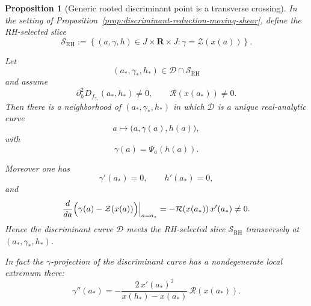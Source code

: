 \documentclass[11pt,a4paper]{amsart}
\theoremstyle{plain}
\newtheorem{proposition}[theorem]{Proposition}
\theoremstyle{definition}
\begin{document}
\begin{proposition}[Generic rooted discriminant point is a transverse crossing]
\label{prop:generic-rooted-discriminant-point-transverse-crossing}
In the setting of
Proposition~\ref{prop:discriminant-reduction-moving-shear},
define the RH-selected slice
\[
\mathcal S_{\mathrm{RH}}
:=
\left\{
(a,\gamma,h)\in J\times\mathbf R\times J:
\gamma=\mathcal Z(x(a))
\right\}.
\]

Let
\[
(a_*,\gamma_*,h_*)\in \mathcal D\cap \mathcal S_{\mathrm{RH}}
\]
and assume
\[
\partial_h^2 D_{f_{\gamma_*}}(a_*,h_*)\neq 0,
\qquad
\mathcal R(x(a_*))\neq 0.
\]
Then there is a neighborhood of $(a_*,\gamma_*,h_*)$ in which
$\mathcal D$ is a unique real-analytic curve
\[
a\longmapsto \bigl(a,\gamma(a),h(a)\bigr),
\]
with
\[
\gamma(a)=\Psi_a(h(a)).
\]

Moreover one has
\[
\gamma'(a_*)=0,
\qquad
h'(a_*)=0,
\]
and
\[
\frac{d}{da}\Bigl(\gamma(a)-\mathcal Z(x(a))\Bigr)\Big|_{a=a_*}
=
-\mathcal R(x(a_*))\,x'(a_*)\neq 0.
\]
Hence the discriminant curve $\mathcal D$ meets the RH-selected slice
$\mathcal S_{\mathrm{RH}}$ transversely at $(a_*,\gamma_*,h_*)$.

In fact the $\gamma$-projection of the discriminant curve has a nondegenerate
local extremum there:
\[
\gamma''(a_*)
=
-\frac{2\,x'(a_*)^2}{x(h_*)-x(a_*)}\,\mathcal R(x(a_*)).
\]
\end{proposition}
\end{document}
